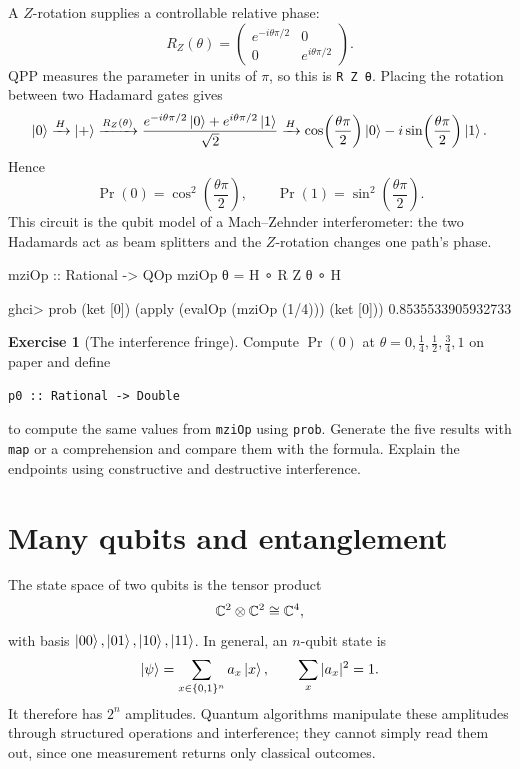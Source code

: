 \documentclass[11pt,a4paper]{article}
\theoremstyle{definition}
\newtheorem{exercise}{Exercise}[section]
\begin{document}
A $Z$-rotation supplies a controllable relative phase:
\[
  R_Z(\theta)=
  \begin{pmatrix}
    e^{-i\theta\pi/2}&0\\0&e^{i\theta\pi/2}
  \end{pmatrix}.
\]
QPP measures the parameter in units of $\pi$, so this is \lstinline|R Z θ|.
Placing the rotation between two Hadamard gates gives
\[
  \left| 0 \right\rangle \xrightarrow{H} \left| + \right\rangle
  \xrightarrow{R_Z(\theta)}
  \frac{e^{-i\theta\pi/2}\left| 0 \right\rangle+e^{i\theta\pi/2}\left| 1 \right\rangle}{\sqrt2}
  \xrightarrow{H}
  \cos\!\left(\frac{\theta\pi}{2}\right)\left| 0 \right\rangle
  -i\sin\!\left(\frac{\theta\pi}{2}\right)\left| 1 \right\rangle.
\]
Hence
\[
  \Pr(0)=\cos^2\!\left(\frac{\theta\pi}{2}\right),\qquad
  \Pr(1)=\sin^2\!\left(\frac{\theta\pi}{2}\right).
\]
This circuit is the qubit model of a Mach--Zehnder interferometer: the two
Hadamards act as beam splitters and the $Z$-rotation changes one path's
phase.
\begin{qppcode}
mziOp :: Rational -> QOp
mziOp θ = H ∘ R Z θ ∘ H

ghci> prob (ket [0]) (apply (evalOp (mziOp (1/4))) (ket [0]))
0.8535533905932733
\end{qppcode}

\begin{exercise}[The interference fringe]
Compute $\Pr(0)$ at $\theta=0,\frac14,\frac12,\frac34,1$ on paper and
define
\begin{lstlisting}
p0 :: Rational -> Double
\end{lstlisting}
to compute the same values from \lstinline|mziOp| using \lstinline|prob|.
Generate the five results with \lstinline|map| or a comprehension and compare
them with the formula.  Explain the endpoints using constructive and
destructive interference.
\end{exercise}

\section{Many qubits and entanglement}
\label{sec:many}

The state space of two qubits is the tensor product
\[
  \mathbb{C}^2\otimes\mathbb{C}^2\cong\mathbb{C}^4,
\]
with basis $\left| 00 \right\rangle,\left| 01 \right\rangle,\left| 10 \right\rangle,\left| 11 \right\rangle$.  In general, an
$n$-qubit state is
\[
  \left| \psi \right\rangle=\sum_{x\in\{0,1\}^n}a_x\left| x \right\rangle,
  \qquad \sum_x|a_x|^2=1.
\]
It therefore has $2^n$ amplitudes.  Quantum algorithms manipulate these
amplitudes through structured operations and interference; they cannot simply
read them out, since one measurement returns only classical outcomes.
\end{document}
